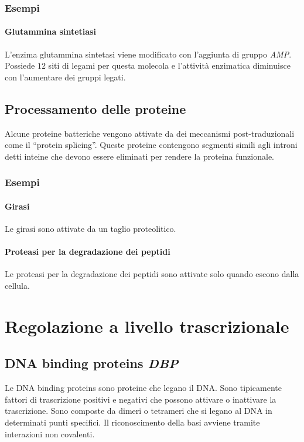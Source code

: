 		\subsubsection{Esempi}

			\paragraph{Glutammina sintetiasi}
			L'enzima glutammina sintetasi viene modificato con l'aggiunta di gruppo \emph{AMP}.
			Possiede $12$ siti di legami per questa molecola e l'attivit\`a enzimatica diminuisce con l'aumentare dei gruppi legati.

	\subsection{Processamento delle proteine}
	Alcune proteine batteriche vengono attivate da dei meccanismi post-traduzionali come il ``protein splicing''.
	Queste proteine contengono segmenti simili agli introni detti inteine che devono essere eliminati per rendere la proteina funzionale.

		\subsubsection{Esempi}

			\paragraph{Girasi}
			Le girasi sono attivate da un taglio proteolitico.

			\paragraph{Proteasi per la degradazione dei peptidi}
			Le proteasi per la degradazione dei peptidi sono attivate solo quando escono dalla cellula.

\section{Regolazione a livello trascrizionale}
	
	\subsection{DNA binding proteins \emph{DBP}}
	Le DNA binding proteins sono proteine che legano il DNA. 
	Sono tipicamente fattori di trascrizione positivi e negativi che possono attivare o inattivare la trascrizione.
	Sono composte da dimeri o tetrameri che si legano al DNA in determinati punti specifici.
	Il riconoscimento della basi avviene tramite interazioni non covalenti.

